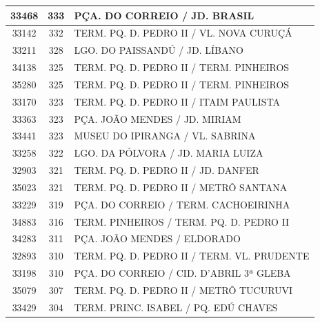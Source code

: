 \documentclass[
	12pt,				%
	oneside,			%
	a4paper,			%
	english,			%
	brazil				%
	]{abntex2ppgsi}
\begin{document}
{{\begin{apendicesenv}
\begin{longtable}{c|c|p{7cm}}
    33468 & 333   & PÇA. DO CORREIO / JD. BRASIL \\
\hline

    33142 & 332   & TERM. PQ. D. PEDRO II / VL. NOVA CURUÇÁ \\
\hline

    33211 & 328   & LGO. DO PAISSANDÚ / JD. LÍBANO \\
\hline

    34138 & 325   & TERM. PQ. D. PEDRO II / TERM. PINHEIROS \\
\hline

    35280 & 325   & TERM. PQ. D. PEDRO II / TERM. PINHEIROS \\
\hline

    33170 & 323   & TERM. PQ. D. PEDRO II / ITAIM PAULISTA \\
\hline

    33363 & 323   & PÇA. JOÃO MENDES / JD. MIRIAM \\
\hline

    33441 & 323   & MUSEU DO IPIRANGA / VL. SABRINA \\
\hline

    33258 & 322   & LGO. DA PÓLVORA / JD. MARIA LUIZA \\
\hline

    32903 & 321   & TERM. PQ. D. PEDRO II / JD. DANFER \\
\hline

    35023 & 321   & TERM. PQ. D. PEDRO II / METRÔ SANTANA \\
\hline

    33229 & 319   & PÇA. DO CORREIO / TERM. CACHOEIRINHA \\
\hline

    34883 & 316   & TERM. PINHEIROS / TERM. PQ. D. PEDRO II \\
\hline

    34283 & 311   & PÇA. JOÃO MENDES / ELDORADO \\
\hline

    32893 & 310   & TERM. PQ. D. PEDRO II / TERM. VL. PRUDENTE \\
\hline

    33198 & 310   & PÇA. DO CORREIO / CID. D'ABRIL 3ª GLEBA \\
\hline

    35079 & 307   & TERM. PQ. D. PEDRO II / METRÔ TUCURUVI \\
\hline

    33429 & 304   & TERM. PRINC. ISABEL / PQ. EDÚ CHAVES \\
\hline


\end{longtable}
\end{apendicesenv}}}
\end{document}
